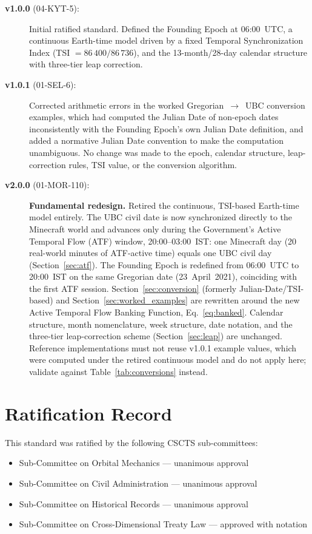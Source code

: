 \documentclass[journal,twoside]{IEEEtran}
\begin{document}
\begin{description}
  \item[\textbf{v1.0.0} (04-KYT-5):] Initial ratified standard. Defined the Founding
    Epoch at 06:00~UTC, a continuous Earth-time model driven by a fixed Temporal
    Synchronization Index (TSI $= 86\,400/86\,736$), and the 13-month/28-day calendar
    structure with three-tier leap correction.
  \item[\textbf{v1.0.1} (01-SEL-6):] Corrected arithmetic errors in the worked
    Gregorian~$\rightarrow$~UBC conversion examples, which had computed the Julian Date
    of non-epoch dates inconsistently with the Founding Epoch's own Julian Date
    definition, and added a normative Julian Date convention to make the computation
    unambiguous. No change was made to the epoch, calendar structure, leap-correction
    rules, TSI value, or the conversion algorithm.
  \item[\textbf{v2.0.0} (01-MOR-110):] \textbf{Fundamental redesign.} Retired the
    continuous, TSI-based Earth-time model entirely. The UBC civil date is now
    synchronized directly to the Minecraft world and advances only during the
    Government's Active Temporal Flow (ATF) window, 20:00--03:00~IST: one Minecraft day
    (20 real-world minutes of ATF-active time) equals one UBC civil day
    (Section~\ref{sec:atf}). The Founding Epoch is redefined from 06:00~UTC to
    20:00~IST on the same Gregorian date (23~April~2021), coinciding with the first ATF
    session. Section~\ref{sec:conversion} (formerly Julian-Date/TSI-based) and
    Section~\ref{sec:worked_examples} are rewritten around the new Active Temporal Flow
    Banking Function, Eq.~\eqref{eq:banked}. Calendar structure, month nomenclature,
    week structure, date notation, and the three-tier leap-correction scheme
    (Section~\ref{sec:leap}) are unchanged. Reference implementations must not reuse
    v1.0.1 example values, which were computed under the retired continuous model and
    do not apply here; validate against Table~\ref{tab:conversions} instead.
\end{description}

\section{Ratification Record}

This standard was ratified by the following CSCTS sub-committees:

\begin{itemize}
  \item Sub-Committee on Orbital Mechanics --- unanimous approval
  \item Sub-Committee on Civil Administration --- unanimous approval
  \item Sub-Committee on Historical Records --- unanimous approval
  \item Sub-Committee on Cross-Dimensional Treaty Law --- approved with notation
\end{itemize}
\end{document}
